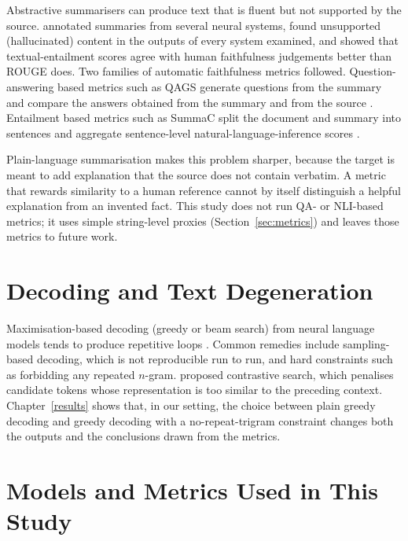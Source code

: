 Abstractive summarisers can produce text that is fluent but not supported by the source. \textcite{maynez2020faithfulness} annotated summaries from several neural systems, found unsupported (hallucinated) content in the outputs of every system examined, and showed that textual-entailment scores agree with human faithfulness judgements better than ROUGE does. Two families of automatic faithfulness metrics followed. Question-answering based metrics such as QAGS generate questions from the summary and compare the answers obtained from the summary and from the source \parencite{wang2020qags}. Entailment based metrics such as SummaC split the document and summary into sentences and aggregate sentence-level natural-language-inference scores \parencite{laban2022summac}.

Plain-language summarisation makes this problem sharper, because the target is meant to add explanation that the source does not contain verbatim. A metric that rewards similarity to a human reference cannot by itself distinguish a helpful explanation from an invented fact. This study does not run QA- or NLI-based metrics; it uses simple string-level proxies (Section~\ref{sec:metrics}) and leaves those metrics to future work.

\section{Decoding and Text Degeneration}

Maximisation-based decoding (greedy or beam search) from neural language models tends to produce repetitive loops \parencite{holtzman2020degeneration}. Common remedies include sampling-based decoding, which is not reproducible run to run, and hard constraints such as forbidding any repeated $n$-gram. \textcite{su2022contrastive} proposed contrastive search, which penalises candidate tokens whose representation is too similar to the preceding context. Chapter~\ref{results} shows that, in our setting, the choice between plain greedy decoding and greedy decoding with a no-repeat-trigram constraint changes both the outputs and the conclusions drawn from the metrics.

\section{Models and Metrics Used in This Study}

